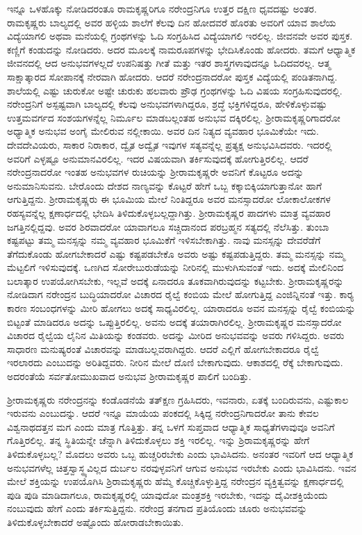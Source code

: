 ಇನ್ನೂ ಒಳಹೊಕ್ಕು ನೋಡಿದರಂತೂ ರಾಮಕೃಷ್ಣರಿಗೂ ನರೇಂದ್ರನಿಗೂ ಉತ್ತರ ದಕ್ಷಿಣ ಧೃವದಷ್ಟು ಅಂತರ. ರಾಮಕೃಷ್ಣರು ಬಾಲ್ಯದಲ್ಲಿ ಅವರ ಹಳ್ಳಿಯ ಶಾಲೆಗೆ ಕೆಲವು ದಿನ ಹೋದವರೆ ಹೊರತು ಅವರಿಗೆ ಯಾವ ಶಾಲೆಯ ವಿದ್ಯೆಯಾಗಲಿ ಅಥವಾ ಮನೆಯಲ್ಲಿ ಗ್ರಂಥಗಳನ್ನು ಓದಿ ಸಂಗ್ರಹಿಸಿದ ವಿದ್ಯೆಯಾಗಲಿ ಇರಲಿಲ್ಲ. ಜೀವನವೇ ಅವರ ಪುಸ್ತಕ. ಕಣ್ಣಿಗೆ ಕಂಡುದನ್ನು ನೋಡಿದರು. ಅದರ ಮೂಲಕ್ಕೆ ನಾಮರೂಪಗಳನ್ನು ಭೇದಿಸಿಕೊಂಡು ಹೋದರು. ತಮಗೆ ಆಧ್ಯಾತ್ಮಿಕ ಜೀವನದಲ್ಲಿ ಆದ ಅನುಭವಗಳಲ್ಲದೆ ಉಪನಿಷತ್ತು ಗೀತೆ ಮತ್ತು ಇತರ ಶಾಸ್ತ್ರಗಳಾವುದನ್ನೂ ಓದಿದವರಲ್ಲ. ಆತ್ಮ ಸಾಕ್ಷಾತ್ಕಾರದ ಸೋಪಾನಕ್ಕೆ ನೇರವಾಗಿ ಹೋದರು. ಆದರೆ ನರೇಂದ್ರನಾದರೋ ಪುಸ್ತಕ ವಿದ್ಯೆಯಲ್ಲಿ ಪಂಡಿತನಾಗಿದ್ದ. ಶಾಲೆಯಲ್ಲಿ ಎಷ್ಟು ಚುರುಕೋ ಅಷ್ಟೇ ಚುರುಕು ಹಲವಾರು ಪ್ರೌಢ ಗ್ರಂಥಗಳನ್ನು ಓದಿ ವಿಷಯ ಸಂಗ್ರಹಿಸುವುದರಲ್ಲಿ. ನರೇಂದ್ರನಿಗೆ ಅಸ್ಪಷ್ಟವಾಗಿ ಬಾಲ್ಯದಲ್ಲಿ ಕೆಲವು ಅನುಭವಗಳಾಗಿದ್ದರೂ, ಶ್ರದ್ಧೆ ಭಕ್ತಿಗಳಿದ್ದರೂ, ಹೇಳಿಕೊಳ್ಳುವಷ್ಟು ಉತ್ತಮವರ್ಗದ ಸಂಶಯಗಳನ್ನೆಲ್ಲ ನಿರ್ಮೂಲ ಮಾಡಬಲ್ಲಂತಹ ಅನುಭವ ದಕ್ಕಿರಲಿಲ್ಲ. ಶ‍್ರೀರಾಮಕೃಷ್ಣರಿಗಾದರೋ ಅಧ್ಯಾತ್ಮಿಕ ಅನುಭವ ಅಂಗೈ ಮೇಲಿರುವ ನಲ್ಲೀಕಾಯಿ. ಅವರ ದಿನ ನಿತ್ಯದ ವ್ಯವಹಾರ ಭೂಮಿಕೆಯೇ ಇದು. ದೇವದೇವಿಯರು, ಸಾಕಾರ ನಿರಾಕಾರ, ದ್ವೈತ ಅದ್ವೈತ ಇವುಗಳ ಸತ್ಯವನ್ನೆಲ್ಲ ಪ್ರತ್ಯಕ್ಷ ಅನುಭವಿಸಿದವರು. ಇದರಲ್ಲಿ ಅವರಿಗೆ ಎಳ್ಳಷ್ಟೂ ಅನುಮಾನವಿರಲಿಲ್ಲ. ಇದರ ವಿಷಯವಾಗಿ ತರ್ಕಿಸುವುದಕ್ಕೆ ಹೋಗುತ್ತಿರಲಿಲ್ಲ. ಆದರೆ ನರೇಂದ್ರನಾದರೋ ಇಂತಹ ಅನುಭವಗಳ ರುಚಿಯನ್ನು ಶ‍್ರೀರಾಮಕೃಷ್ಣರೇ ಅವನಿಗೆ ಕೊಟ್ಟರೂ ಅದನ್ನು ಅನುಮಾನಿಸುವನು. ಬೇರೊಂದು ದೇಶದ ನಾಣ್ಯವನ್ನು ಕೊಟ್ಟರೆ ಹೇಗೆ ಒಬ್ಬ ಕಕ್ಕಾಬಿಕ್ಕಿಯಾಗುತ್ತಾನೋ ಹಾಗೆ ಆಗುತ್ತಿದ್ದನು. ಶ‍್ರೀರಾಮಕೃಷ್ಣರು ಈ ಭೂಮಿಯ ಮೇಲೆ ನಿಂತಿದ್ದರೂ ಅವರ ಮನಸ್ಸಾದರೋ ಲೋಕಾಲೋಕಗಳ ರಹಸ್ಯವನ್ನೆಲ್ಲ ಕ್ಷಣಾರ್ಧದಲ್ಲಿ ಭೇದಿಸಿ ತಿಳಿದುಕೊಳ್ಳಬಲ್ಲದ್ದಾಗಿತ್ತು. ಶ‍್ರೀರಾಮಕೃಷ್ಣರ ಪಾದಗಳು ಮಾತ್ರ ವ್ಯವಹಾರ ಜಗತ್ತಿನಲ್ಲಿದ್ದವು. ಅವರ ಶಿರವಾದರೋ ಯಾವಾಗಲೂ ಸಚ್ಚಿದಾನಂದ ಪರಬ್ರಹ್ಮನ ಸತ್ಯದಲ್ಲಿ ನೆಲೆಸಿತ್ತು. ತುಂಬಾ ಕಷ್ಟಪಟ್ಟು ತಮ್ಮ ಮನಸ್ಸನ್ನು ನಮ್ಮ ವ್ಯವಹಾರ ಭೂಮಿಕೆಗೆ ಇಳಿಸಬೇಕಾಗಿತ್ತು. ನಾವು ಮನಸ್ಸನ್ನು ದೇವರೆಡೆಗೆ ತೆಗೆದುಕೊಂಡು ಹೋಗಬೇಕಾದರೆ ಎಷ್ಟು ಕಷ್ಟಪಡಬೇಕೊ ಅವರು ಅಷ್ಟು ಕಷ್ಟಪಡುತ್ತಿದ್ದರು. ತಮ್ಮ ಮನಸ್ಸನ್ನು ನಮ್ಮ ಮೆಟ್ಟಲಿಗೆ ಇಳಿಸುವುದಕ್ಕೆ. ಒಣಗಿದ ಸೋರೇಬುರುಡೆಯನ್ನು ನೀರಿನಲ್ಲಿ ಮುಳುಗಿಸುವಂತೆ ಇದು. ಅದಕ್ಕೆ ಮೇಲಿನಿಂದ ಬಲಾತ್ಕಾರ ಉಪಯೋಗಿಸಬೇಕು, ಇಲ್ಲವೆ ಅದಕ್ಕೆ ಏನಾದರೂ ತೂಕವಾಗಿರುವುದನ್ನು ಕಟ್ಟಬೇಕು. ಶ‍್ರೀರಾಮಕೃಷ್ಣರನ್ನು ನೋಡಿದಾಗ ನರೇಂದ್ರನ ಬುದ್ಧಿಯಾದರೋ ವಿಚಾರದ ರೈಲ್ವೆ ಕಂಬಿಯ ಮೇಲೆ ಹೋಗುತ್ತಿದ್ದ ಎಂಜಿನ್ನಿನಂತೆ ಇತ್ತು. ಕಾರ‍್ಯ ಕಾರಣ ಸಂಬಂಧಗಳನ್ನು ಮೀರಿ ಹೋಗಲು ಅದಕ್ಕೆ ಸಾಧ್ಯವಿರಲಿಲ್ಲ. ಯಾರಾದರೂ ಅವನ ಮನಸ್ಸನ್ನು ರೈಲ್ವೆ ಕಂಬಿಯನ್ನು ಬಿಟ್ಟಂತೆ ಮಾಡಿದರೂ ಅದನ್ನು ಒಪ್ಪುತ್ತಿರಲಿಲ್ಲ. ಅವನು ಅದಕ್ಕೆ ತಯಾರಾಗಿರಲಿಲ್ಲ. ಶ‍್ರೀರಾಮಕೃಷ್ಣರ ಮನಸ್ಸಾದರೋ ವಿಚಾರದ ರೈಲ್ವೆಯ ಲೈನಿನ ಮಿತಿಯನ್ನು ಕಂಡವರು. ಅದನ್ನು ಮೀರಿದ ಅನುಭವವನ್ನು ಅವರು ಗಳಿಸಿದ್ದರು. ಅವರು ಸಾಧಾರಣ ಮನುಷ್ಯರಂತೆ ವಿಚಾರವನ್ನು ಮಾಡಬಲ್ಲವರಾಗಿದ್ದರು. ಆದರೆ ಎಲ್ಲಿಗೆ ಹೋಗಬೇಕಾದರೂ ರೈಲ್ವೆ ಇರಲಾರದು ಎಂಬುದನ್ನು ಅರಿತಿದ್ದವರು. ನೀರಿನ ಮೇಲೆ ದೊಣಿ ಬೇಕಾಗುವುದು. ಆಕಾಶದಲ್ಲಿ ರೆಕ್ಕೆ ಬೇಕಾಗುವುದು. ಅದರಂತೆಯೆ ಸರ್ವತೋಮುಖವಾದ ಅನುಭವ ಶ‍್ರೀರಾಮಕೃಷ್ಣರ ಪಾಲಿಗೆ ಬಂದಿತ್ತು.

ಶ‍್ರೀರಾಮಕೃಷ್ಣರು ನರೇಂದ್ರನನ್ನು ಕಂಡೊಡನೆಯೆ ತತ್‍ಕ್ಷಣ ಗ್ರಹಿಸಿದರು, ಇವನಾರು, ಏತಕ್ಕೆ ಬಂದಿರುವನು, ಎಷ್ಟುಕಾಲ ಇರುವನು ಎಂಬುದನ್ನು. ಆದರೆ ಇನ್ನೂ ಮಾಯೆಯ ಪಂಕದಲ್ಲಿ ಸಿಕ್ಕಿದ್ದ ನರೇಂದ್ರನಿಗಾದರೋ ತಾನು ಕೇವಲ ವಿಶ್ವನಾಥದತ್ತನ ಮಗ ಎಂದು ಮಾತ್ರ ಗೊತ್ತಿತ್ತು. ತನ್ನ ಒಳಗೆ ಸುಪ್ತವಾದ ಆಧ್ಯಾತ್ಮಿಕ ಸಾಧ್ಯತೆಗಳಾವುವೂ ಅವನಿಗೆ ಗೊತ್ತಿರಲಿಲ್ಲ. ತನ್ನ ಸ್ಥಿತಿಯನ್ನೇ ಚೆನ್ನಾಗಿ ತಿಳಿದುಕೊಳ್ಳಲು ಶಕ್ತಿ ಇರಲಿಲ್ಲ. ಇನ್ನು ಶ್ರಿರಾಮಕೃಷ್ಣರನ್ನು ಹೇಗೆ ತಿಳಿದುಕೊಳ್ಳಬಲ್ಲ? ಮೊದಲು ಅವರು ಒಬ್ಬ ಹುಚ್ಚರಿರಬೇಕು ಎಂದು ಭಾವಿಸಿದನು. ಅನಂತರ ಇವರಿಗೆ ಆದ ಆಧ್ಯಾತ್ಮಿಕ ಅನುಭವಗಳೆಲ್ಲ ಚಿತ್ತಸ್ವಾಸ್ಥ್ಯವಿಲ್ಲದ ದುರ್ಬಲ ನರವುಳ್ಳವನಿಗೆ ಆಗುವ ಅನುಭವ ಇರಬೇಕು ಎಂದು ಭಾವಿಸಿದನು. ಇವನ ಮೇಲೆ ಶಕ್ತಿಯನ್ನು ಉಪಯೊಗಿಸಿ ಶ್ರಿರಾಮಕೃಷ್ಣರು ಹೆಮ್ಮೆ ಕೊಚ್ಚಿಕೊಳ್ಳುತ್ತಿದ್ದ ನರೇಂದ್ರನ ವ್ಯಕ್ತಿತ್ವವನ್ನು ಕ್ಷಣಾರ್ಧದಲ್ಲಿ ಪುಡಿ ಪುಡಿ ಮಾಡಿದಾಗಲೂ, ರಾಮಕೃಷ್ಣರಲ್ಲಿ ಯಾವುದೋ ಮಂತ್ರಶಕ್ತಿ ಇರಬೇಕು, ಇದನ್ನು ದೈವೀಶಕ್ತಿಯೆಂದು ನಂಬುವುದು ಹೇಗೆ ಎಂದು ತರ್ಕಿಸುತ್ತಿದ್ದನು. ನರೇಂದ್ರ ತನಗಾದ ಪ್ರತಿಯೊಂದು ಚೂರು ಅನುಭವವನ್ನು ತಿಳಿದುಕೊಳ್ಳಬೇಕಾದರೆ ಅಷ್ಟೊಂದು ಹೋರಾಡಬೇಕಾಯಿತು.

